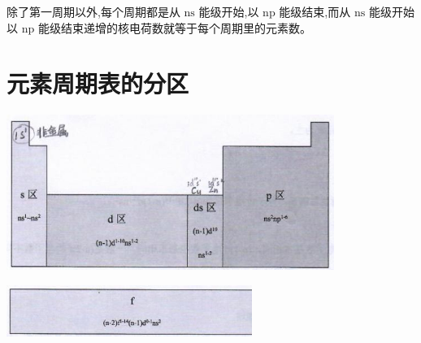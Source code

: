 \documentclass[10pt,cn]{elegantbook}
\begin{document}
	 除了第一周期以外,每个周期都是从 \(\mathrm{{ns}}\) 能级开始,以 \(\mathrm{{np}}\) 能级结束,而从 \(\mathrm{{ns}}\) 能级开始以 \(\mathrm{{np}}\) 能级结束递增的核电荷数就等于每个周期里的元素数。

\section{元素周期表的分区}

\begin{center}
	\includegraphics[max width=0.8\textwidth]{image/c61-1.jpg}
\end{center}

\begin{center}
	\includegraphics[max width=0.6\textwidth]{image/c61-2.jpg}
\end{center}
\end{document}
